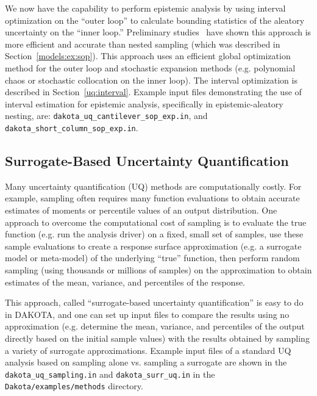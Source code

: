 We now have the capability to perform epistemic analysis by 
using interval optimization on the ``outer loop'' to calculate bounding 
statistics of the aleatory uncertainty on the ``inner loop.''  
Preliminary studies~\cite{Eld09b} have shown this approach is more efficient 
and accurate than nested sampling (which was described in 
Section~\ref{models:ex:sop}).  This approach uses 
an efficient global optimization method for the outer loop and 
stochastic expansion methods (e.g. polynomial chaos or stochastic 
collocation on the inner loop).  The interval optimization is described in 
Section~\ref{uq:interval}.  Example input files demonstrating 
the use of interval estimation for epistemic analysis, 
specifically in epistemic-aleatory nesting, are: 
\texttt{dakota\_uq\_cantilever\_sop\_exp.in}, and
\texttt{dakota\_short\_column\_sop\_exp.in}. 

\subsection{Surrogate-Based Uncertainty Quantification} \label{models:ex:sbuq}

Many uncertainty quantification (UQ) methods are computationally costly. 
For example, sampling often requires many function evaluations to obtain 
accurate estimates of moments or percentile values of an output distribution.  
One approach to overcome the computational cost of sampling is to 
evaluate the true function (e.g. run the analysis driver) on a fixed, small
set of samples, use these sample evaluations to 
create a response surface approximation (e.g. a surrogate model or meta-model)
of the underlying ``true'' function, then perform random sampling (using 
thousands or millions of samples) on the approximation to obtain estimates 
of the mean, variance, and percentiles of the response. 

This approach, called ``surrogate-based uncertainty quantification'' 
is easy to do in DAKOTA, and one can set up input files to compare the 
results using no approximation (e.g. determine the mean, variance, and 
percentiles of the output directly based on the initial sample values) 
with the results obtained by sampling a variety of surrogate approximations.  
Example input files of a standard UQ analysis based on sampling alone vs. 
sampling a surrogate are shown in the \texttt{dakota\_uq\_sampling.in} and 
\texttt{dakota\_surr\_uq.in} in the \texttt{Dakota/examples/methods}
directory. 


